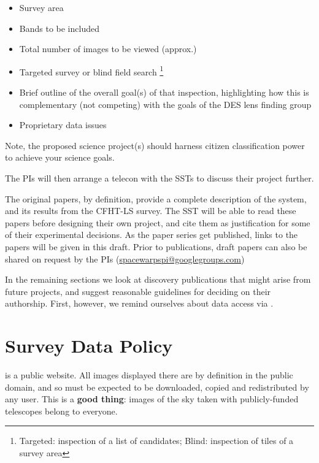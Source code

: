\documentclass[a4paper,twocolumn]{article}
\begin{document}
\begin{itemize}
\item Survey area
\item Bands to be included
\item Total number of images to be viewed (approx.)
\item Targeted survey or blind field search \footnote{Targeted: inspection of a list of candidates; Blind: inspection of tiles of a survey area}
\item Brief outline of the overall goal(s) of that inspection, highlighting how this is complementary (not competing) with the goals of the DES lens finding group
\item Proprietary data issues 
\end{itemize}

Note, the proposed science project(s) should harness citizen classification power to achieve your science goals.

The \sw PIs will then arrange a telecon with the SSTs to discuss their project further.

The original \sw papers, by definition, provide a complete description of the system, and its results from the CFHT-LS survey. The SST will be able
to read these papers before designing their own \sw project, and cite them as justification for some of their experimental decisions. As the \sw paper series get published, links to the papers will be given in this draft. Prior to publications, draft papers can also be shared on request by the \sw PIs (\href{mailto:spacewarpspi@googlegroups.com}{spacewarpspi@googlegroups.com})


In the remaining sections we look at discovery publications that might
arise from future \sw projects, and suggest reasonable guidelines for
deciding on their authorship. First, however, we remind ourselves about data
access via \sw.



\section{Survey Data Policy}
\label{sec:data}

\sw is a public website. All images displayed there are by definition in the
public domain, and so must be expected to be downloaded, copied and
redistributed by any \sw user. This is a \textbf{good thing}: images of the sky taken
with publicly-funded telescopes belong to everyone. 
\end{document}
